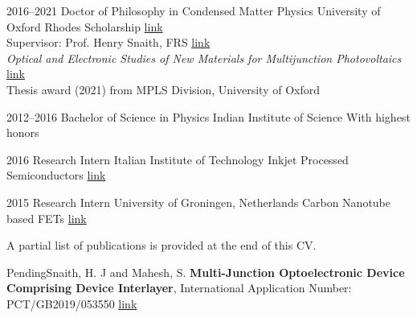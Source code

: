 \documentclass{scrartcl}
\begin{document}
\begin{entrylist}
\entry
{2016--2021}
{Doctor of Philosophy in Condensed Matter Physics}
{University of Oxford}
{Rhodes Scholarship \href{https://www.rhodeshouse.ox.ac.uk/scholars/rhodes-scholars-class-of-2016/suhas-mahesh/}{link}\\
Supervisor: Prof. Henry Snaith, FRS \href{https://scholar.google.com/citations?user=I2D3pUMAAAAJ&hl=en}{link}\\
\emph{Optical and Electronic Studies of New Materials for Multijunction Photovoltaics }\href{http://dx.doi.org/10.5287/bodleian:mNArOK77N}{link}\\
Thesis award (2021) from MPLS Division, University of Oxford \\
}

\entry
{2012--2016}
{Bachelor of Science in Physics}
{Indian Institute of Science}
{With highest honors}

\entry
{2016}
{Research Intern}
{Italian Institute of Technology}
{Inkjet Processed Semiconductors \href{https://scholar.google.it/citations?user=f3suRUkAAAAJ&hl=en}{link}}

\entry
{2015}
{Research Intern}
{University of Groningen, Netherlands}
{Carbon Nanotube based FETs \href{https://scholar.google.com/citations?user=Cw22GB8AAAAJ&hl=en}{link}}
\end{entrylist}

\bigskip
{} A partial list of publications is provided at the end of this CV. \bigskip


\begin{entrylist}
\splitentry
{Pending}{Snaith, H. J and Mahesh, S. \textbf{Multi-Junction Optoelectronic Device Comprising Device Interlayer}, International Application Number: PCT/GB2019/053550 \href{https://patents.google.com/patent/WO2020120991A1/}{link} }{}

\end{entrylist} 


\end{document}
